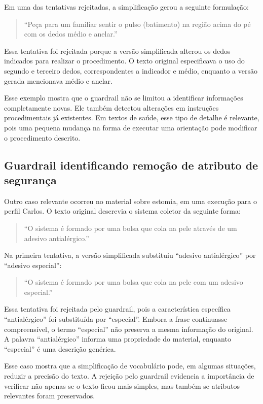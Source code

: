 Em uma das tentativas rejeitadas, a simplificação gerou a seguinte formulação:

\begin{quote}
``Peça para um familiar sentir o pulso (batimento) na região acima do pé com os dedos médio e anelar.''
\end{quote}

Essa tentativa foi rejeitada porque a versão simplificada alterou os dedos indicados para realizar o procedimento. O texto original especificava o uso do segundo e terceiro dedos, correspondentes a indicador e médio, enquanto a versão gerada mencionava médio e anelar.

Esse exemplo mostra que o guardrail não se limitou a identificar informações completamente novas. Ele também detectou alterações em instruções procedimentais já existentes. Em textos de saúde, esse tipo de detalhe é relevante, pois uma pequena mudança na forma de executar uma orientação pode modificar o procedimento descrito.

\subsection{Guardrail identificando remoção de atributo de segurança}
\label{subsec:guardrail-remocao-atributo-seguranca}

Outro caso relevante ocorreu no material sobre estomia, em uma execução para o perfil Carlos. O texto original descrevia o sistema coletor da seguinte forma:

\begin{quote}
``O sistema é formado por uma bolsa que cola na pele através de um adesivo antialérgico.''
\end{quote}

Na primeira tentativa, a versão simplificada substituiu ``adesivo antialérgico'' por ``adesivo especial'':

\begin{quote}
``O sistema é formado por uma bolsa que cola na pele com um adesivo especial.''
\end{quote}

Essa tentativa foi rejeitada pelo guardrail, pois a característica específica ``antialérgico'' foi substituída por ``especial''. Embora a frase continuasse compreensível, o termo ``especial'' não preserva a mesma informação do original. A palavra ``antialérgico'' informa uma propriedade do material, enquanto ``especial'' é uma descrição genérica.

Esse caso mostra que a simplificação de vocabulário pode, em algumas situações, reduzir a precisão do texto. A rejeição pelo guardrail evidencia a importância de verificar não apenas se o texto ficou mais simples, mas também se atributos relevantes foram preservados.

